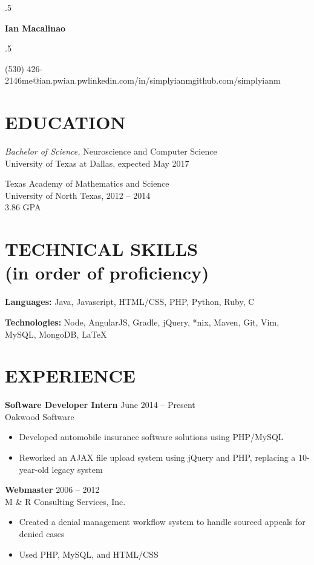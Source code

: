 \documentclass[margin, 10pt]{res} %
\newcommand*{\its}{\hspace{0.8cm}}
\begin{document}
\moveleft.5\hoffset\centerline{\Huge\bf Ian Macalinao}
\bigskip
\moveleft.5\hoffset\centerline{(530) 426-2146\its{}me@ian.pw\its{}ian.pw\its{}linkedin.com/in/simplyianm\its{}github.com/simplyianm}

\begin{resume}

  \section{EDUCATION}

  {\sl Bachelor of Science,} Neuroscience and Computer Science \\
  University of Texas at Dallas, expected May 2017
  \medskip

  Texas Academy of Mathematics and Science \\
  University of North Texas, 2012 -- 2014 \\
  3.86 GPA

  \section{TECHNICAL SKILLS \\ \textnormal{(in order of proficiency)}} 

  {\bf Languages:} Java, Javascript, HTML/CSS, PHP, Python, Ruby, C

  {\bf Technologies:} Node, AngularJS, Gradle, jQuery, *nix, Maven, Git, Vim, MySQL, MongoDB, LaTeX

  \section{EXPERIENCE}

  {\bf Software Developer Intern} \hfill June 2014 -- Present \\
  Oakwood Software

  \begin{itemize} \itemsep -2pt
    \item Developed automobile insurance software solutions using PHP/MySQL
    \item Reworked an AJAX file upload system using jQuery and PHP, replacing a 10-year-old legacy system
  \end{itemize}

  {\bf Webmaster} \hfill 2006 -- 2012 \\
  M \& R Consulting Services, Inc.
  \begin{itemize} \itemsep -2pt
    \item Created a denial management workflow system to handle sourced appeals for denied cases
    \item Used PHP, MySQL, and HTML/CSS
  \end{itemize} 


\end{resume}
\end{document}
